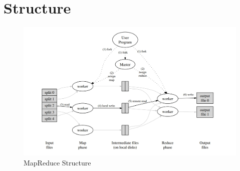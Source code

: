 \documentclass{article}
\begin{document}
\section{Structure}
\begin{figure}
      \centering
      \includegraphics[scale = 0.4]{structure.png}
      \caption{MapReduce Structure \cite{dean2008mapreduce}}
\end{figure}
\end{document}

